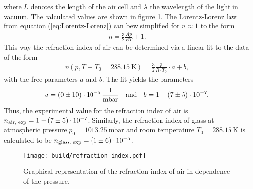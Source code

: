 where $L$ denotes the length of the air cell and $\lambda$ the wavelength of the light in vacuum.
The calculated values are shown in figure \ref{fig:refraction_index}.
The Lorentz-Lorenz law from equation (\ref{eq:Lorentz-Lorenz}) can bew simplified for $n\approx1$ to the form
\begin{align}
    n = \frac 32 \frac{Ap}{RT}+1.
\end{align}
This way the refraction index of air can be determined via a linear fit to the data of the form
\begin{align}
    n(p, T\equiv T_0=\SI{288.15}{\kelvin}) = \frac 32 \frac{p}{R\cdot T_0}\cdot a + b,
\end{align}
with the free parameters $a$ and $b$.
The fit yields the parameters
\begin{align*}
    a = \SI{0\pm 10e-5}{\per\milli\bar} \quad \text{and} \quad b = 1 - \num{7\pm5e-7}.
\end{align*}
Thus, the experimental value for the refraction index of air is $n_{\text{air, exp}}=1-\num{7\pm5e-7}$.
Similarly, the refraction index of glass at atmospheric pressure $p_0=\SI{1013.25}{\milli\bar}$ and room temperature $T_0=\SI{288.15}{\kelvin}$ is calculated to be $n_{\text{glass, exp}}=\num{1\pm 6e-5}$.


\begin{figure}[H]
    \centering
    \texttt{[image: build/refraction\_index.pdf]}
    \caption{Graphical representation of the refraction index of air in dependence of the pressure.}
    \label{fig:refraction_index}
  \end{figure}